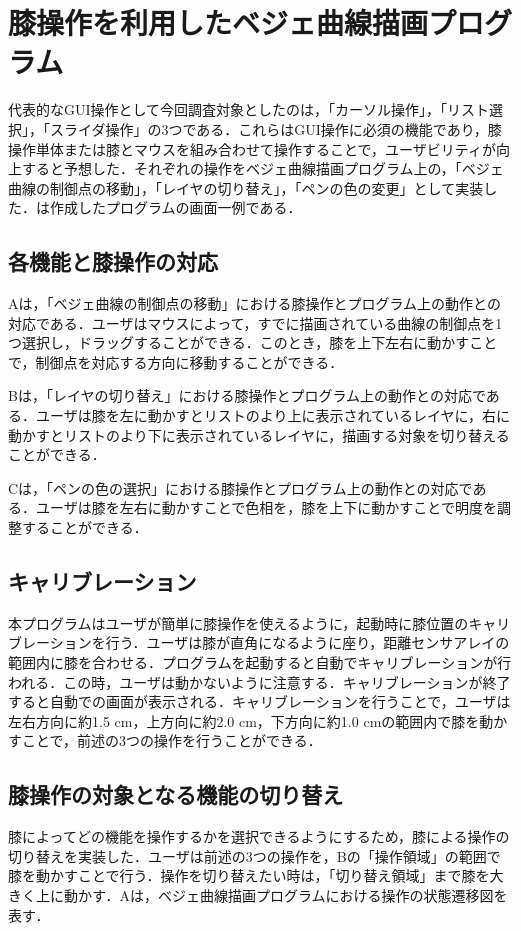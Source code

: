 \documentclass[submit, techrep]{ipsj}
\begin{document}
\section{膝操作を利用したベジェ曲線描画プログラム}
代表的なGUI操作として今回調査対象としたのは，「カーソル操作」，「リスト選択」，「スライダ操作」の3つである．これらはGUI操作に必須の機能であり，膝操作単体または膝とマウスを組み合わせて操作することで，ユーザビリティが向上すると予想した．それぞれの操作をベジェ曲線描画プログラム上の，「ベジェ曲線の制御点の移動」，「レイヤの切り替え」，「ペンの色の変更」として実装した．は作成したプログラムの画面一例である．
\subsection{各機能と膝操作の対応}
Aは，「ベジェ曲線の制御点の移動」における膝操作とプログラム上の動作との対応である．ユーザはマウスによって，すでに描画されている曲線の制御点を1つ選択し，ドラッグすることができる．このとき，膝を上下左右に動かすことで，制御点を対応する方向に移動することができる．\par
{}Bは，「レイヤの切り替え」における膝操作とプログラム上の動作との対応である．ユーザは膝を左に動かすとリストのより上に表示されているレイヤに，右に動かすとリストのより下に表示されているレイヤに，描画する対象を切り替えることができる．\par
{}Cは，「ペンの色の選択」における膝操作とプログラム上の動作との対応である．ユーザは膝を左右に動かすことで色相を，膝を上下に動かすことで明度を調整することができる．
\subsection{キャリブレーション}
本プログラムはユーザが簡単に膝操作を使えるように，起動時に膝位置のキャリブレーションを行う．ユーザは膝が直角になるように座り，距離センサアレイの範囲内に膝を合わせる．プログラムを起動すると自動でキャリブレーションが行われる．この時，ユーザは動かないように注意する．キャリブレーションが終了すると自動での画面が表示される．キャリブレーションを行うことで，ユーザは左右方向に約1.5 \si{cm}，上方向に約2.0 \si{cm}，下方向に約1.0 \si{cm}の範囲内で膝を動かすことで，前述の3つの操作を行うことができる．\subsection{膝操作の対象となる機能の切り替え}
膝によってどの機能を操作するかを選択できるようにするため，膝による操作の切り替えを実装した．ユーザは前述の3つの操作を，Bの「操作領域」の範囲で膝を動かすことで行う．操作を切り替えたい時は，「切り替え領域」まで膝を大きく上に動かす．Aは，ベジェ曲線描画プログラムにおける操作の状態遷移図を表す．
\end{document}
